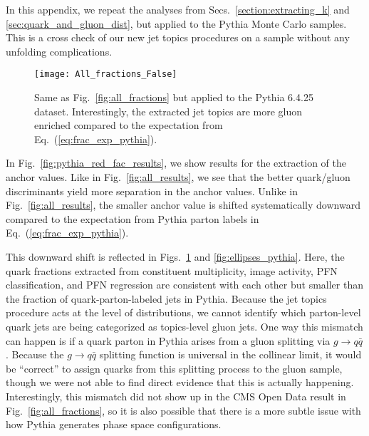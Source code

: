 \documentclass[aps,prd,twocolumn,preprintnumbers,nofootinbib,longbibliography,floatfix]{revtex4-1}
\DeclareRobustCommand{\Secs}[2]{Secs.~\ref{#1} and \ref{#2}}
\DeclareRobustCommand{\Fig}[1]{Fig.~\ref{#1}}
\DeclareRobustCommand{\Figs}[2]{Figs.~\ref{#1} and \ref{#2}}
\DeclareRobustCommand{\Eq}[1]{Eq.~(\ref{#1})}
\newcommand{\Pythia}{{\sc Pythia}\xspace}
\begin{document}
In this appendix, we repeat the analyses from \Secs{section:extracting_k}{sec:quark_and_gluon_dist}, but applied to the \Pythia Monte Carlo samples.
%
This is a cross check of our new jet topics procedures on a sample without any unfolding complications.

\begin{figure}[t]
	\texttt{[image: All\_fractions\_False]}
	\caption{
	Same as \Fig{fig:all_fractions} but applied to the \Pythia 6.4.25 dataset.  Interestingly, the extracted jet topics are more gluon enriched compared to the expectation from \Eq{eq:frac_exp_pythia}. 
	}
	\label{fig:pythia_quark_frac_results}
\end{figure}


\begin{figure*}[t]
	\caption{
	Same as \Fig{fig:ellipse_cvu} but applied to the \Pythia 6.4.25 dataset.  Interestingly, the ellipses are offset from, but diagonally aligned with, the parton label expectation from \Eq{eq:frac_exp_pythia}.
	}
	\label{fig:ellipses_pythia}
\end{figure*}


In \Fig{fig:pythia_red_fac_results}, we show results for the extraction of the anchor values.
%
Like in \Fig{fig:all_results}, we see that the better quark/gluon discriminants yield more separation in the anchor values.
%
Unlike in \Fig{fig:all_results}, the smaller anchor value is shifted systematically downward compared to the expectation from \Pythia parton labels in \Eq{eq:frac_exp_pythia}.


This downward shift is reflected in \Figs{fig:pythia_quark_frac_results}{fig:ellipses_pythia}.
%
Here, the quark fractions extracted from constituent multiplicity, image activity, PFN classification, and PFN regression are consistent with each other but smaller than the fraction of quark-parton-labeled jets in \Pythia.
%
Because the jet topics procedure acts at the level of distributions, we cannot identify which parton-level quark jets are being categorized as topics-level gluon jets.
%
One way this mismatch can happen is if a quark parton in \Pythia arises from a gluon splitting via $g \to q \bar{q}$.
%
Because the $g \to q \bar{q}$ splitting function is universal in the collinear limit, it would be ``correct'' to assign quarks from this splitting process to the gluon sample, though we were not able to find direct evidence that this is actually happening.
%
Interestingly, this mismatch did not show up in the CMS Open Data result in \Fig{fig:all_fractions}, so it is also possible that there is a more subtle issue with how \Pythia generates phase space configurations.
\end{document}
